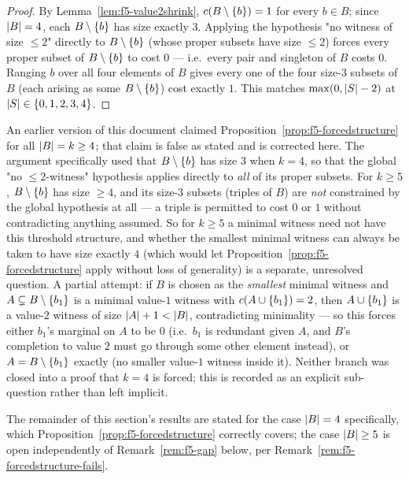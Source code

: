 \begin{proof}
By Lemma~\ref{lem:f5-value2shrink}, $c(B \setminus \left\{b\right\}) = 1$ for every
$b \in B$; since $\left\lvert B\right\rvert = 4$, each $B \setminus \left\{b\right\}$ has size exactly
$3$. Applying the hypothesis "no witness of size $\le 2$" directly to
$B \setminus \left\{b\right\}$ (whose proper subsets have size $\le 2$) forces every
proper subset of $B \setminus \left\{b\right\}$ to cost $0$ --- i.e.\ every pair and
singleton of $B$ costs $0$. Ranging $b$ over all four elements of $B$ gives
every one of the four size-$3$ subsets of $B$ (each arising as some
$B \setminus \left\{b\right\}$) cost exactly $1$. This matches $\max(0,\left\lvert S\right\rvert-2)$ at
$\left\lvert S\right\rvert \in \left\{0,1,2,3,4\right\}$.
\end{proof}

\begin{remark}
\label{rem:f5-forcedstructure-fails}
An earlier version of this document claimed
Proposition~\ref{prop:f5-forcedstructure} for all $\left\lvert B\right\rvert = k \ge 4$; that
claim is false as stated and is corrected here. The argument specifically used
that $B \setminus \left\{b\right\}$ has size $3$ when $k = 4$, so that the global
"no $\le 2$-witness" hypothesis applies directly to \emph{all} of its proper
subsets. For $k \ge 5$, $B \setminus \left\{b\right\}$ has size $\ge 4$, and its
size-$3$ subsets (triples of $B$) are \emph{not} constrained by the global
hypothesis at all --- a triple is permitted to cost $0$ or $1$ without
contradicting anything assumed. So for $k \ge 5$ a minimal witness need not
have this threshold structure, and whether the smallest minimal witness can
always be taken to have size exactly $4$ (which would let
Proposition~\ref{prop:f5-forcedstructure} apply without loss of generality) is
a separate, unresolved question. A partial attempt: if $B$ is chosen as the
\emph{smallest} minimal witness and $A \subsetneq B \setminus \left\{b_1\right\}$ is a
minimal value-$1$ witness with $c(A \cup \left\{b_1\right\}) = 2$, then
$A \cup \left\{b_1\right\}$ is a value-$2$ witness of size $\left\lvert A\right\rvert + 1 < \left\lvert B\right\rvert$,
contradicting minimality --- so this forces either $b_1$'s marginal on $A$ to
be $0$ (i.e.\ $b_1$ is redundant given $A$, and $B$'s completion to value $2$
must go through some other element instead), or $A = B \setminus \left\{b_1\right\}$
exactly (no smaller value-$1$ witness inside it). Neither branch was closed
into a proof that $k = 4$ is forced; this is recorded as an explicit
sub-question rather than left implicit.
\end{remark}

The remainder of this section's results are stated for the case $\left\lvert B\right\rvert = 4$
specifically, which Proposition~\ref{prop:f5-forcedstructure} correctly
covers; the case $\left\lvert B\right\rvert \ge 5$ is open independently of
Remark~\ref{rem:f5-gap} below, per Remark~\ref{rem:f5-forcedstructure-fails}.

